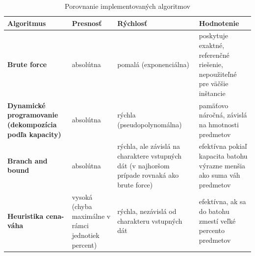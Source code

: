 \documentclass[slovak]{article}
\begin{document}
\begin{table}[htb!]\centering
	\begin{tabularx}{\textwidth}{ | X | X | X | X |}
	  \hline                       
		\textbf{Algoritmus}			& \textbf{Presnosť} 	& \textbf{Rýchlosť} 	& \textbf{Hodnotenie} 	\\ \hline
		\textbf{Brute force}		& absolútna				&	pomalá (exponenciálna)		&	poskytuje exaktné, referenčné riešenie, nepoužiteľné pre väčšie inštancie 			\\ \hline
		\textbf{Dynamické programovanie (dekompozícia podľa kapacity)}		& absolútna				&	rýchla (pseudopolynomálna)		&	pamäťovo náročná, závislá na hmotnosti predmetov			\\ \hline
		\textbf{Branch and bound}	& absolútna				&	rýchla, ale závislá na charaktere vstupných dát (v najhoršom prípade rovnaká ako brute force)	& 	efektívna pokiaľ kapacita batohu výrazne menšia ako suma váh predmetov		\\ \hline
		\textbf{Heuristika cena-váha}& vysoká (chyba maximálne v rámci jednotiek percent)				&	rýchla, nezávislá od charakteru vstupných dát		&	efektívna, ak sa do batohu zmestí veľké percento predmetov			\\ \hline
	\end{tabularx}	
\caption{Porovnanie implementovaných algoritmov}
\label{tab9}
\end{table}
\end{document}
